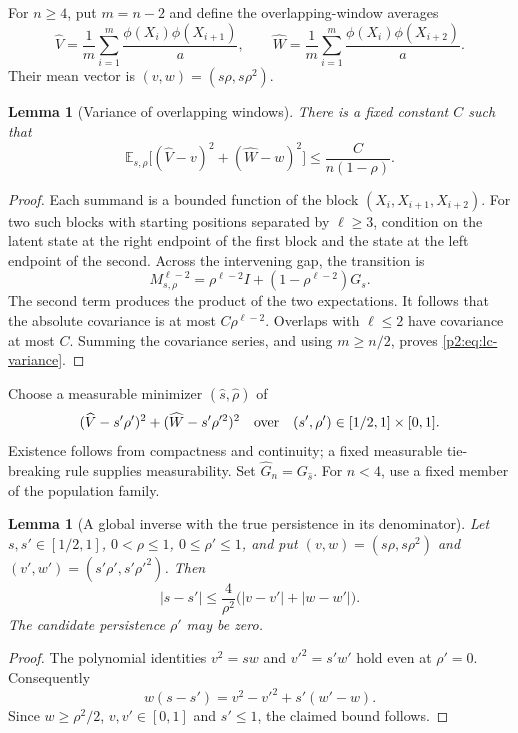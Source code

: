 \documentclass[11pt,a4paper]{article}
\newtheorem{lemma}[theorem]{Lemma}
\theoremstyle{definition}
\theoremstyle{remark}
\numberwithin{equation}{section}
\begin{document}
For $n\ge4$, put $m=n-2$ and define the overlapping-window averages
\[
 \widehat V=\frac1m\sum_{i=1}^{m}
                  \frac{\phi(X_i)\phi(X_{i+1})}{a},\qquad
 \widehat W=\frac1m\sum_{i=1}^{m}
                  \frac{\phi(X_i)\phi(X_{i+2})}{a}.
\]
Their mean vector is $(v,w)=(s\rho,s\rho^2)$.

\begin{lemma}[Variance of overlapping windows]\label{p2:lem:lc-variance}
There is a fixed constant $C$ such that
\begin{equation}\label{p2:eq:lc-variance}
 \mathbb E_{s,\rho}
       \bigl[(\widehat V-v)^2+(\widehat W-w)^2\bigr]
 \le\frac C{n(1-\rho)}.
\end{equation}
\end{lemma}
\begin{proof}
Each summand is a bounded function of the block $(X_i,X_{i+1},X_{i+2})$.
For two such blocks with starting positions separated by $\ell\ge3$,
condition on the latent state at the right endpoint of the first block and
the state at the left endpoint of the second.  Across the intervening gap,
the transition is
\[
 M_{s,\rho}^{\ell-2}
   =\rho^{\ell-2}I+(1-\rho^{\ell-2})G_s.
\]
The second term produces the product of the two expectations.  It follows
that the absolute covariance is at most $C\rho^{\ell-2}$.  Overlaps with
$\ell\le2$ have covariance at most $C$.  Summing the covariance series,
and using $m\ge n/2$, proves \eqref{p2:eq:lc-variance}.
\end{proof}

Choose a measurable minimizer $(\widehat s,\widehat\rho)$ of
\begin{equation}\label{p2:eq:lc-projection}
 (\widehat V-s'\rho')^2+(\widehat W-s'\rho'^2)^2
 \quad\hbox{over}\quad
 (s',\rho')\in[1/2,1]\times[0,1].
\end{equation}
Existence follows from compactness and continuity; a fixed measurable
tie-breaking rule supplies measurability.  Set $\widehat G_n=G_{\widehat s}$.
For $n<4$, use a fixed member of the population family.

\begin{lemma}[A global inverse with the true persistence in its denominator]
\label{p2:lem:lc-inverse}
Let $s,s'\in[1/2,1]$, $0<\rho\le1$, $0\le\rho'\le1$, and put
$(v,w)=(s\rho,s\rho^2)$ and $(v',w')=(s'\rho',s'\rho'^2)$.  Then
\begin{equation}\label{p2:eq:lc-inverse}
 |s-s'|\le\frac4{\rho^2}
                 \bigl(|v-v'|+|w-w'|\bigr).
\end{equation}
The candidate persistence $\rho'$ may be zero.
\end{lemma}
\begin{proof}
The polynomial identities $v^2=sw$ and $v'^2=s'w'$ hold even at $\rho'=0$.
Consequently
\[
 w(s-s')=v^2-v'^2+s'(w'-w).
\]
Since $w\ge\rho^2/2$, $v,v'\in[0,1]$ and $s'\le1$, the claimed bound follows.
\end{proof}
\end{document}
